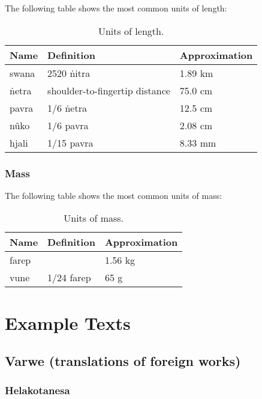 \documentclass{book}
\begin{document}
The following table shows the most common units of length:

\begin{table}[h]
    \caption{Units of length.}
    \centering
    \begin{tabu} to \linewidth {|l|X|X|}
        \hline
        Name & Definition & Approximation \\
        \hline
        swana & 2520 ṅitra & 1.89 km \\
        ṅetra & shoulder-to-fingertip distance & 75.0 cm \\
        pavra & 1/6 ṅetra & 12.5 cm \\
        nûko & 1/6 pavra & 2.08 cm \\
        hjali & 1/15 pavra & 8.33 mm \\
        \hline
    \end{tabu}
\end{table}

\subsection{Mass}

The following table shows the most common units of mass:

\begin{table}[h]
    \caption{Units of mass.}
    \centering
    \begin{tabu} to \linewidth {|l|X|X|}
        \hline
        Name & Definition & Approximation \\
        \hline
        farep & & 1.56 kg \\
        vune & 1/24 farep & 65 g \\
        \hline
    \end{tabu}
\end{table}


\chapter{Example Texts}

\section{Varwe (translations of foreign works)}

\subsection{Helakotanesa}
\end{document}
